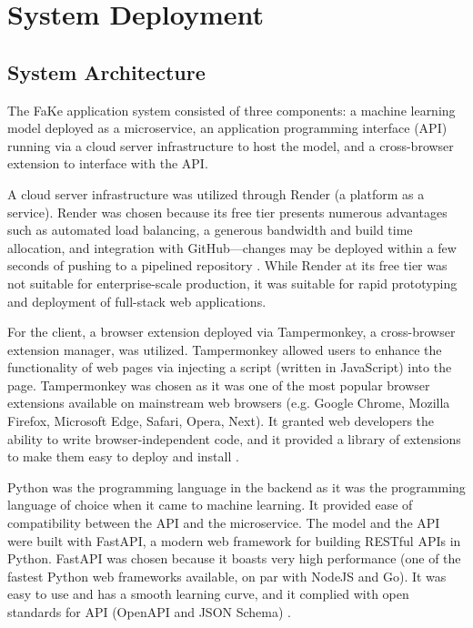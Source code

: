 \section{System Deployment}

\subsection{System Architecture}

The FaKe application system consisted of three components: a machine learning model deployed as a microservice, an application programming interface (API) running via a cloud server infrastructure to host the model, and a cross-browser extension to interface with the API.

A cloud server infrastructure was utilized through Render (a platform as a service). Render was chosen because its free tier presents numerous advantages such as automated load balancing, a generous bandwidth and build time allocation, and integration with GitHub—changes may be deployed within a few seconds of pushing to a pipelined repository \cite{render-docs}. While Render at its free tier was not suitable for enterprise-scale production, it was suitable for rapid prototyping and deployment of full-stack web applications.

For the client, a browser extension deployed via Tampermonkey, a cross-browser extension manager, was utilized. Tampermonkey allowed users to enhance the functionality of web pages via injecting a script (written in JavaScript) into the page. Tampermonkey was chosen as it was one of the most popular browser extensions available on mainstream web browsers (e.g. Google Chrome, Mozilla Firefox, Microsoft Edge, Safari, Opera, Next). It granted web developers the ability to write browser-independent code, and it provided a library of extensions to make them easy to deploy and install \cite{tampermonkey-website}.

Python was the programming language in the backend as it was the programming language of choice when it came to machine learning. It provided ease of compatibility between the API and the microservice. The model and the API were built with FastAPI, a modern web framework for building RESTful APIs in Python. FastAPI was chosen because it boasts very high performance (one of the fastest Python web frameworks available, on par with NodeJS and Go). It was easy to use and has a smooth learning curve, and it complied with open standards for API (OpenAPI and JSON Schema) \cite{fastapi-website}.

